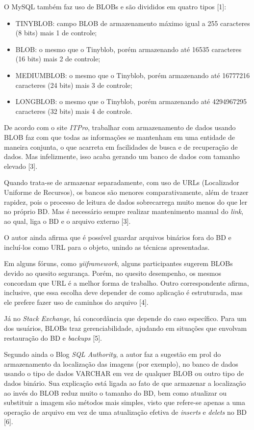 \documentclass[12pt,a4paper]{article}
\begin{document}
O MySQL também faz uso de BLOBs e são divididos em quatro tipos [1]:
\begin{itemize}
	\item TINYBLOB: campo BLOB de armazenamento máximo igual a 255 caracteres (8 bits) mais 1 de controle;
	\item BLOB: o mesmo que o Tinyblob, porém armazenando até 16535 caracteres (16 bits) mais 2 de controle;
	\item MEDIUMBLOB: o mesmo que o Tinyblob, porém armazenando até 16777216 caracteres (24 bits) mais 3 de controle;
	\item LONGBLOB: o mesmo que o Tinyblob, porém armazenando até 4294967295 caracteres (32 bits) mais 4 de controle.
\end{itemize}

De acordo com o site \textit{ITPro}, trabalhar com armazenamento de dados usando BLOB faz com que todas as informações se mantenham em uma entidade de maneira conjunta, o que acarreta em facilidades de busca e de recuperação de dados. Mas infelizmente, isso acaba gerando um banco de dados com tamanho elevado [3]. 

Quando trata-se de armazenar separadamente, com uso de URLs (Localizador Uniforme de Recursos), os bancos são menores comparativamente, além de trazer rapidez, pois o processo de leitura de dados sobrecarrega muito menos do que ler no próprio BD. Mas é necessário sempre realizar mantenimento manual do \textit{link}, ao qual, liga o BD e o arquivo externo [3].

O autor ainda afirma que é possível guardar arquivos binários fora do BD e incluí-los como URL para o objeto, unindo as técnicas apresentadas.

Em alguns fóruns, como \textit{yiiframework}, alguns participantes sugerem BLOBs devido ao quesito segurança. Porém, no quesito desempenho, os mesmos concordam que URL é a melhor forma de trabalho. Outro correspondente afirma, inclusive, que essa escolha deve depender de como aplicação é estruturada, mas ele prefere fazer uso de caminhos do arquivo [4].

Já no \textit{Stack Exchange}, há concordância que depende do caso específico. Para um dos usuários, BLOBs traz gerenciabilidade, ajudando em situações que envolvam restauração do BD e \textit{backups} [5]. 

Segundo ainda o Blog \textit{SQL Authority}, a autor faz a sugestão em prol do armazenamento da localização das imagens (por exemplo), no banco de dados usando o tipo de dados VARCHAR em vez de qualquer BLOB ou outro tipo de dados binário. Sua explicação está ligada ao fato de que armazenar a localização ao invés do BLOB reduz muito o tamanho do BD, bem como atualizar ou substituir a imagem são métodos mais simples, visto que refere-se apenas a uma operação de arquivo em vez de uma atualização efetiva de \textit{inserts} e \textit{delets} no BD [6].
 
\end{document}
